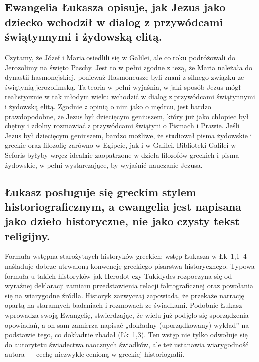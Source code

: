 \subsection{Ewangelia Łukasza opisuje, jak Jezus jako dziecko wchodził w dialog z przywódcami świątynnymi i żydowską elitą.}\label{subsec:the-gospel-of-luke-describes-how-jesus-engaged-with-temple-leaders-and-the-jewish-elite-when-he-was-a-child.}

Czytamy, że Józef i Maria osiedlili się w Galilei, ale co roku podróżowali do Jerozolimy na święto Paschy.
Jest to w pełni zgodne z tezą, że Maria należała do dynastii hasmonejskiej, ponieważ Hasmoneusze byli znani z silnego związku ze świątynią jerozolimską.
Ta teoria w pełni wyjaśnia, w jaki sposób Jezus mógł realistycznie w tak młodym wieku wchodzić w dialog z przywódcami świątynnymi i żydowską elitą.
Zgodnie z opinią o nim jako o mędrcu, jest bardzo prawdopodobne, że Jezus był dziecięcym geniuszem, który już jako chłopiec był chętny i zdolny rozmawiać z przywódcami świątyni o Pismach i Prawie.
Jeśli Jezus był dziecięcym geniuszem, bardzo możliwe, że studiował pisma żydowskie i greckie oraz filozofię zarówno w Egipcie, jak i w Galilei.
Biblioteki Galilei w Seforis byłyby wręcz idealnie zaopatrzone w dzieła filozofów greckich i pisma żydowskie, w pełni wystarczające, by wyjaśnić nauczanie Jezusa.

\subsection{Łukasz posługuje się greckim stylem historiograficznym, a ewangelia jest napisana jako dzieło historyczne, nie jako czysty tekst religijny.}\label{subsec:luke-is-using-greek-historical-writing-style-and-the-gospel-is-written-not-a-religious-text.}

Formuła wstępna starożytnych historyków greckich: wstęp Łukasza w Łk~1,1–4 naśladuje dobrze utrwaloną konwencję greckiego pisarstwa historycznego.
Typowa formuła u takich historyków jak Herodot czy Tukidydes rozpoczyna się od wyraźnej deklaracji zamiaru przedstawienia relacji faktograficznej oraz powołania się na wiarygodne źródła.
Historyk zazwyczaj zapowiada, że przekaże narrację opartą na starannych badaniach i rozmowach ze świadkami.
Podobnie Łukasz wprowadza swoją Ewangelię, stwierdzając, że wielu już podjęło się sporządzenia opowiadań, a on sam zamierza napisać „dokładny (uporządkowany) wykład” na podstawie tego, co dokładnie zbadał (Łk~1,3).
Ten wstęp nie tylko odwołuje się do autorytetu świadectwa naocznych świadków, ale też ustanawia wiarygodność autora — cechę niezwykle cenioną w greckiej historiografii.

